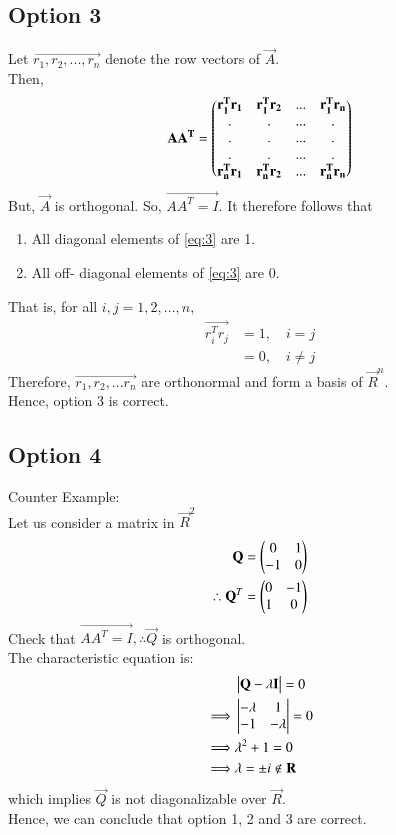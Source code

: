 \documentclass[journal,12pt,twocolumn]{IEEEtran}
\begin{document}
\subsection{Option 3}
Let $\vec{r_1, r_2, ..., r_n}$ denote the row vectors of $\vec A$.\\
Then, 
\begin{align}
    \mathbf{AA^T} = \begin{pmatrix}\mathbf{r_1^Tr_1} & \mathbf{r_1^T r_2} & ... & \mathbf{r_1^Tr_n}\\ . & . &... & .\\ . & . &... & .\\. & . &... & .\\ \mathbf{r_n^Tr_1} & \mathbf{r_n^Tr_2} & ... & \mathbf{r_n^T r_n}\end{pmatrix} \label{eq:3}
\end{align}
But, $\vec A $ is orthogonal. So, $\vec {AA^T = I}$. It therefore follows that
\begin{enumerate}
    \item All diagonal elements of \eqref{eq:3} are 1.
    \item All off- diagonal elements of \eqref{eq:3} are 0.
\end{enumerate}
That is, for all $i, j =1, 2, ..., n $, 
\begin{align}
    \vec{r_i^T r_j} &= 1 ,\quad  i=j\\
    &= 0 , \quad i\neq j
\end{align}
Therefore, $\vec{r_1, r_2, ... r_n}$ are orthonormal and form a basis of $\vec R^n$.\\
Hence, option 3 is correct.
\subsection{Option 4}
Counter Example:\\
Let us consider a matrix  in $ \vec R^2 $
\begin{align}
    \mathbf Q= \begin{pmatrix} 0 & 1 \\-1 & 0\end{pmatrix}\\
    \therefore \mathbf Q^T =\begin{pmatrix} 0 & -1\\1 & 0\end{pmatrix}
\end{align}
Check that $\vec{AA^T= I},  \therefore \vec Q$ is orthogonal. \\
The characteristic equation is:
\begin{align}
    &\begin{vmatrix}\mathbf Q- \lambda\mathbf I\end{vmatrix}=0\\
    \implies & \begin{vmatrix}-\lambda & 1\\ -1 & -\lambda\end{vmatrix}=0\\
    \implies & \lambda^2 + 1 = 0\\
    \implies & \lambda= \pm i \notin \mathbf R
\end{align}
which implies $\vec Q$ is not diagonalizable over $\vec R$.\\

Hence, we can conclude that option 1, 2 and 3 are correct.
\end{document}
